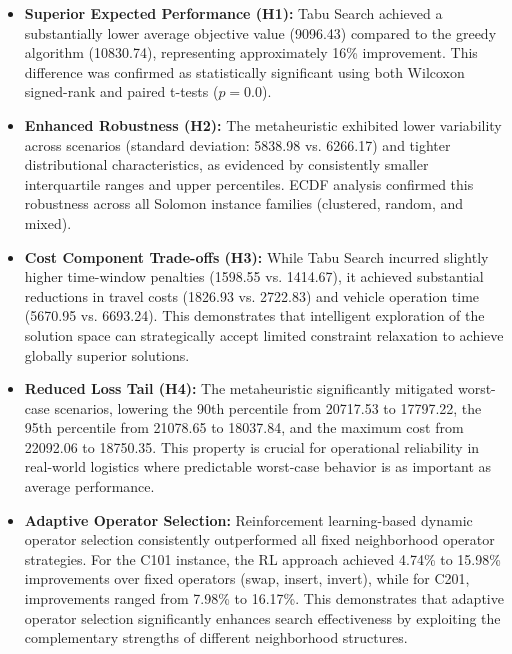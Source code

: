 \begin{itemize}
    \item \textbf{Superior Expected Performance (H1):} Tabu Search achieved a substantially lower average objective value (9096.43) compared to the greedy algorithm (10830.74), representing approximately 16\% improvement. This difference was confirmed as statistically significant using both Wilcoxon signed-rank and paired t-tests ($p = 0.0$).
    
    \item \textbf{Enhanced Robustness (H2):} The metaheuristic exhibited lower variability across scenarios (standard deviation: 5838.98 vs. 6266.17) and tighter distributional characteristics, as evidenced by consistently smaller interquartile ranges and upper percentiles. ECDF analysis confirmed this robustness across all Solomon instance families (clustered, random, and mixed).
    
    \item \textbf{Cost Component Trade-offs (H3):} While Tabu Search incurred slightly higher time-window penalties (1598.55 vs. 1414.67), it achieved substantial reductions in travel costs (1826.93 vs. 2722.83) and vehicle operation time (5670.95 vs. 6693.24). This demonstrates that intelligent exploration of the solution space can strategically accept limited constraint relaxation to achieve globally superior solutions.
    
    \item \textbf{Reduced Loss Tail (H4):} The metaheuristic significantly mitigated worst-case scenarios, lowering the 90th percentile from 20717.53 to 17797.22, the 95th percentile from 21078.65 to 18037.84, and the maximum cost from 22092.06 to 18750.35. This property is crucial for operational reliability in real-world logistics where predictable worst-case behavior is as important as average performance.
    
    \item \textbf{Adaptive Operator Selection:} Reinforcement learning-based dynamic operator selection consistently outperformed all fixed neighborhood operator strategies. For the C101 instance, the RL approach achieved 4.74\% to 15.98\% improvements over fixed operators (swap, insert, invert), while for C201, improvements ranged from 7.98\% to 16.17\%. This demonstrates that adaptive operator selection significantly enhances search effectiveness by exploiting the complementary strengths of different neighborhood structures.
\end{itemize}


